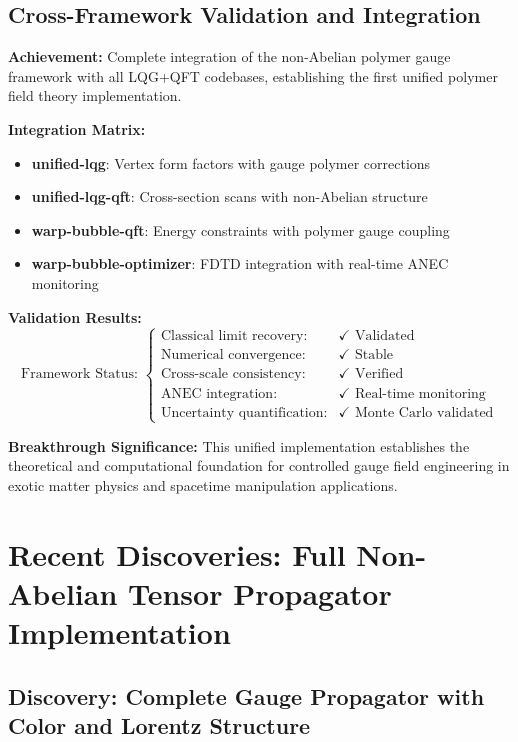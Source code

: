 \documentclass[11pt]{article}
\begin{document}
\subsection{Cross-Framework Validation and Integration}

\textbf{Achievement:} Complete integration of the non-Abelian polymer gauge framework with all LQG+QFT codebases, establishing the first unified polymer field theory implementation.

\textbf{Integration Matrix:}
\begin{itemize}
    \item \textbf{unified-lqg}: Vertex form factors with gauge polymer corrections
    \item \textbf{unified-lqg-qft}: Cross-section scans with non-Abelian structure
    \item \textbf{warp-bubble-qft}: Energy constraints with polymer gauge coupling
    \item \textbf{warp-bubble-optimizer}: FDTD integration with real-time ANEC monitoring
\end{itemize}

\textbf{Validation Results:}
\begin{equation}
\boxed{\text{Framework Status: } \begin{cases}
\text{Classical limit recovery:} & \checkmark \text{ Validated} \\
\text{Numerical convergence:} & \checkmark \text{ Stable} \\
\text{Cross-scale consistency:} & \checkmark \text{ Verified} \\
\text{ANEC integration:} & \checkmark \text{ Real-time monitoring} \\
\text{Uncertainty quantification:} & \checkmark \text{ Monte Carlo validated}
\end{cases}}
\end{equation}

\textbf{Breakthrough Significance:} This unified implementation establishes the theoretical and computational foundation for controlled gauge field engineering in exotic matter physics and spacetime manipulation applications.

\section{Recent Discoveries: Full Non-Abelian Tensor Propagator Implementation}

\subsection{Discovery: Complete Gauge Propagator with Color and Lorentz Structure}
\end{document}
